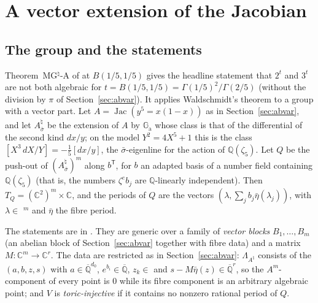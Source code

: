 \documentclass[11pt]{amsart}
\theoremstyle{definition}
\theoremstyle{remark}
\numberwithin{equation}{section}
\newcommand{\QQ}{\mathbb{Q}}
\newcommand{\CC}{\mathbb{C}}
\newcommand{\Qbar}{\overline{\mathbb{Q}}}
\newcommand{\Ga}{\mathbb{G}_{\mathrm{a}}}
\begin{document}
\section{A vector extension of the Jacobian}\label{sec:abvarv}

\subsection{The group and the statements}
Theorem~MG$^\natural$-A of \cite{Note} at $B(1/5,1/5)$ gives the headline statement that $2^t$ and $3^t$ are
not both algebraic for $t=B(1/5,1/5)=\Gamma(1/5)^2/\Gamma(2/5)$ (without the division by $\pi$ of
Section~\ref{sec:abvar}). It applies Waldschmidt's theorem to a group with a vector part. Let
$A=\operatorname{Jac}(y^5=x(1-x))$ as in Section~\ref{sec:abvar}, and let $A_{\bar\sigma}^\natural$ be the extension of $A$
by $\Ga$ whose class is that of the differential of the second kind $dx/y$; on the model $Y^2=4X^5+1$ this is the
class $[X^3\,dX/Y]=-\tfrac15[dx/y]$, the $\bar\sigma$-eigenline for the action of $\QQ(\zeta_5)$. Let $Q$ be the push-out
of $(A_{\bar\sigma}^\natural)^m$ along $b^{\mathsf T}$, for $b$ an adapted basis of a number field containing $\QQ(\zeta_5)$
(that is, the numbers $\zeta^e b_j$ are $\QQ$-linearly independent). Then $T_Q=(\CC^2)^m\times\CC$, and the periods of $Q$
are the vectors $(\lambda,\sum_j b_j\bar\eta(\lambda_j))$, with $\lambda\in$ ${}^m$ and $\bar\eta$ the fibre
period.

The statements are in . They are generic over a family of \emph{vector blocks}
$B_1,\dots,B_m$ (an abelian block of Section~\ref{sec:abvar} together with fibre data) and a matrix $M\colon\CC^m\to\CC^r$.
The data are restricted as in Section~\ref{sec:abvar}: $\Lambda_{A^\natural}$ consists of the $(a,b,z,s)$ with
$a\in\Qbar^{d_0}$, $e^{b_i}\in\Qbar$, $z_k\in$  and $s-M\bar\eta(z)\in\Qbar^r$, so the $A^m$-component of every
point is $0$ while its fibre component is an arbitrary algebraic point; and $V$ is \emph{toric-injective} if it
contains no nonzero rational period of $Q$.
\end{document}
